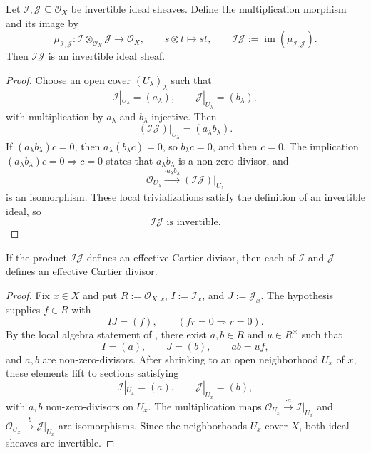 \begin{lemma}
  \label{lemma:nagata-invertible-ideal-mul}
  \lean{}

  Let $\mathcal I,\mathcal J\subseteq\mathcal O_X$ be invertible ideal
  sheaves.  Define the multiplication morphism and its image by
  \[
    \mu_{\mathcal I,\mathcal J}\colon
      \mathcal I\otimes_{\mathcal O_X}\mathcal J
        \longrightarrow\mathcal O_X,
    \qquad s\otimes t\longmapsto st,
    \qquad
    \mathcal I\mathcal J:=
      \operatorname{im}(\mu_{\mathcal I,\mathcal J}).
  \]
  Then $\mathcal I\mathcal J$ is an invertible ideal sheaf.
\end{lemma}

\begin{proof}
  Choose an open cover $(U_\lambda)_\lambda$ such that
  \[
    \mathcal I|_{U_\lambda}=(a_\lambda),\qquad
    \mathcal J|_{U_\lambda}=(b_\lambda),
  \]
  with multiplication by $a_\lambda$ and $b_\lambda$ injective.  Then
  \[
    (\mathcal I\mathcal J)|_{U_\lambda}=(a_\lambda b_\lambda).
  \]
  If $(a_\lambda b_\lambda)c=0$, then
  $a_\lambda(b_\lambda c)=0$, so $b_\lambda c=0$, and then $c=0$.
  The implication
  $(a_\lambda b_\lambda)c=0\Rightarrow c=0$ states that
  $a_\lambda b_\lambda$ is a non-zero-divisor, and
  \[
    \mathcal O_{U_\lambda}\xrightarrow{\cdot a_\lambda b_\lambda}
      (\mathcal I\mathcal J)|_{U_\lambda}
  \]
  is an isomorphism.  These local trivializations satisfy the definition of
  an invertible ideal, so
  \[
    \mathcal I\mathcal J\text{ is invertible}.
  \]
\end{proof}

\begin{lemma}
  \label{lemma:nagata-invertible-product-factor}
  \lean{}

  If the product $\mathcal I\mathcal J$ defines an effective Cartier divisor,
  then each of $\mathcal I$ and $\mathcal J$ defines an effective Cartier
  divisor.
\end{lemma}

\begin{proof}
  Fix $x\in X$ and put
  $R:=\mathcal O_{X,x}$, $I:=\mathcal I_x$, and $J:=\mathcal J_x$.
  The hypothesis supplies $f\in R$ with
  \[
    IJ=(f),\qquad
    (f r=0\Longrightarrow r=0).
  \]
  By the local algebra statement of \cite[Tag 07ZV]{stacks-project}, there
  exist $a,b\in R$ and $u\in R^\times$ such that
  \[
    I=(a),\qquad J=(b),\qquad ab=uf,
  \]
  and $a,b$ are non-zero-divisors.  After shrinking to an open neighborhood
  $U_x$ of $x$, these elements lift to sections satisfying
  \[
    \mathcal I|_{U_x}=(a),\qquad
    \mathcal J|_{U_x}=(b),
  \]
  with $a,b$ non-zero-divisors on $U_x$.  The multiplication maps
  $\mathcal O_{U_x}\xrightarrow{\cdot a}\mathcal I|_{U_x}$ and
  $\mathcal O_{U_x}\xrightarrow{\cdot b}\mathcal J|_{U_x}$ are isomorphisms.
  Since the neighborhoods $U_x$ cover $X$, both ideal sheaves are invertible.
\end{proof}

